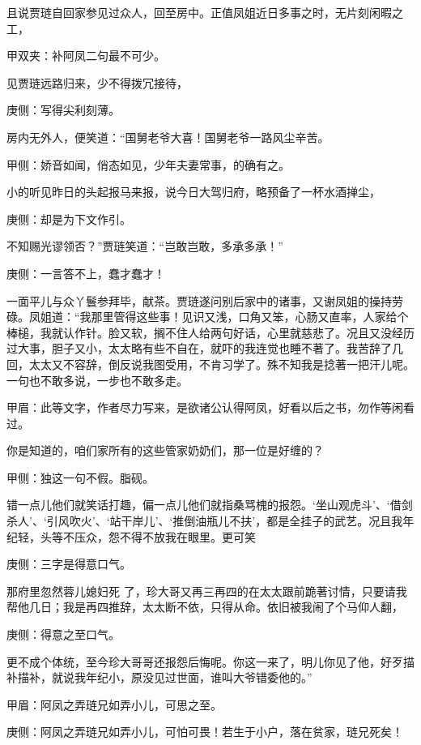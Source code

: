 \begin{parag}
    且说贾琏自回家参见过众人，回至房中。正值凤姐近日多事之时，无片刻闲暇之工，\begin{note}甲双夹：补阿凤二句最不可少。\end{note}见贾琏远路归来，少不得拨冗接待，\begin{note}庚侧：写得尖利刻薄。\end{note}房内无外人，便笑道：“国舅老爷大喜！国舅老爷一路风尘辛苦。\begin{note}甲侧：娇音如闻，俏态如见，少年夫妻常事，的确有之。\end{note}小的听见昨日的头起报马来报，说今日大驾归府，略预备了一杯水酒掸尘，\begin{note}庚侧：却是为下文作引。\end{note}不知赐光谬领否？”贾琏笑道：“岂敢岂敢，多承多承！”\begin{note}庚侧：一言答不上，蠢才蠢才！\end{note}一面平儿与众丫鬟参拜毕，献茶。贾琏遂问别后家中的诸事，又谢凤姐的操持劳碌。凤姐道：“我那里管得这些事！见识又浅，口角又笨，心肠又直率，人家给个棒槌，我就认作针。脸又软，搁不住人给两句好话，心里就慈悲了。况且又没经历过大事，胆子又小，太太略有些不自在，就吓的我连觉也睡不著了。我苦辞了几回，太太又不容辞，倒反说我图受用，不肯习学了。殊不知我是捻著一把汗儿呢。一句也不敢多说，一步也不敢多走。\begin{note}甲眉：此等文字，作者尽力写来，是欲诸公认得阿凤，好看以后之书，勿作等闲看过。\end{note}你是知道的，咱们家所有的这些管家奶奶们，那一位是好缠的？\begin{note}甲侧：独这一句不假。脂砚。\end{note}错一点儿他们就笑话打趣，偏一点儿他们就指桑骂槐的报怨。‘坐山观虎斗’、‘借剑杀人’、‘引风吹火’、‘站干岸儿’、‘推倒油瓶儿不扶’，都是全挂子的武艺。况且我年纪轻，头等不压众，怨不得不放我在眼里。更可笑\begin{note}庚侧：三字是得意口气。\end{note}那府里忽然蓉儿媳妇死 了，珍大哥又再三再四的在太太跟前跪著讨情，只要请我帮他几日；我是再四推辞，太太断不依，只得从命。依旧被我闹了个马仰人翻，\begin{note}庚侧：得意之至口气。\end{note}更不成个体统，至今珍大哥哥还报怨后悔呢。你这一来了，明儿你见了他，好歹描补描补，就说我年纪小，原没见过世面，谁叫大爷错委他的。”\begin{note}甲眉：阿凤之弄琏兄如弄小儿，可思之至。\end{note}\begin{note}庚侧：阿凤之弄琏兄如弄小儿，可怕可畏！若生于小户，落在贫家，琏兄死矣！\end{note}
\end{parag}


